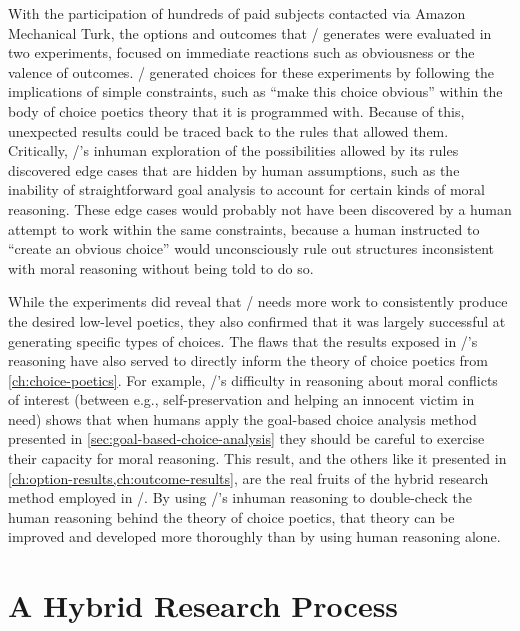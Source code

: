 With the participation of hundreds of paid subjects contacted via Amazon Mechanical Turk, the options and outcomes that \dunyazad/ generates were evaluated in two experiments, focused on immediate reactions such as obviousness or the valence of outcomes.
%
\dunyazad/ generated choices for these experiments by following the implications of simple constraints, such as ``make this choice obvious'' within the body of choice poetics theory that it is programmed with.
%
Because of this, unexpected results could be traced back to the rules that allowed them.
%
Critically, \dunyazad/'s inhuman exploration of the possibilities allowed by its rules discovered edge cases that are hidden by human assumptions, such as the inability of straightforward goal analysis to account for certain kinds of moral reasoning.
%
These edge cases would probably not have been discovered by a human attempt to work within the same constraints, because a human instructed to ``create an obvious choice'' would unconsciously rule out structures inconsistent with moral reasoning without being told to do so.


While the experiments did reveal that \dunyazad/ needs more work to consistently produce the desired low-level poetics, they also confirmed that it was largely successful at generating specific types of choices.
%
The flaws that the results exposed in \dunyazad/'s reasoning have also served to directly inform the theory of choice poetics from \cref{ch:choice-poetics}.
%
For example, \dunyazad/'s difficulty in reasoning about moral conflicts of interest (between e.g., self-preservation and helping an innocent victim in need) shows that when humans apply the goal-based choice analysis method presented in \cref{sec:goal-based-choice-analysis} they should be careful to exercise their capacity for moral reasoning.
%
This result, and the others like it presented in \cref{ch:option-results,ch:outcome-results}, are the real fruits of the hybrid research method employed in \dunyazad/.
%
By using \dunyazad/'s inhuman reasoning to double-check the human reasoning behind the theory of choice poetics, that theory can be improved and developed more thoroughly than by using human reasoning alone.


\section{A Hybrid Research Process}


